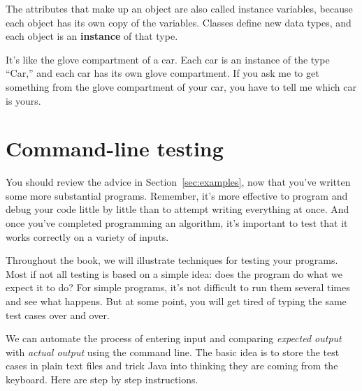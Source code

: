 The attributes that make up an object are also called instance variables, because each object has its own copy of the variables.
Classes define new data types, and each object is an {\bf instance} of that type.

It's like the glove compartment of a car.
Each car is an instance of the type ``Car,'' and each car has its own glove compartment.
If you ask me to get something from the glove compartment of your car, you have to tell me which car is yours.



\section{Command-line testing}

You should review the advice in Section~\ref{sec:examples}, now that you've written some more substantial programs.
Remember, it's more effective to program and debug your code little by little than to attempt writing everything at once.
And once you've completed programming an algorithm, it's important to test that it works correctly on a variety of inputs.

Throughout the book, we will illustrate techniques for testing your programs.
Most if not all testing is based on a simple idea: does the program do what we expect it to do?
For simple programs, it's not difficult to run them several times and see what happens.
But at some point, you will get tired of typing the same test cases over and over.

We can automate the process of entering input and comparing {\em expected output} with {\em actual output} using the command line.
The basic idea is to store the test cases in plain text files and trick Java into thinking they are coming from the keyboard.
Here are step by step instructions.

